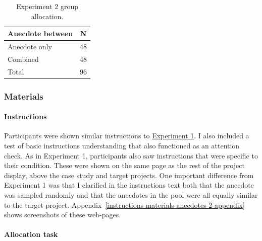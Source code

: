 \documentclass[a4paper, nobind, dvipsnames]{templates/ociamthesis}
\theoremstyle{definition}
\theoremstyle{definition}
\theoremstyle{definition}
\theoremstyle{definition}
\theoremstyle{remark}
\begin{document}
\begin{table}[tbp]

\begin{center}
\begin{threeparttable}

\caption{\label{tab:condition-allocation-anecdotes-2}Experiment 2 group allocation.}

\begin{tabular}{ll}
\toprule
Anecdote between & \multicolumn{1}{c}{N}\\
\midrule
Anecdote only & 48\\
Combined & 48\\
Total & 96\\
\bottomrule
\end{tabular}

\end{threeparttable}
\end{center}

\end{table}

\hypertarget{materials-4}{%
\subsubsection{Materials}\label{materials-4}}

\hypertarget{instructions-4}{%
\paragraph{Instructions}\label{instructions-4}}

Participants were shown similar instructions to \protect\hyperlink{instructions-materials-anecdotes-1}{Experiment
1}. I also included a test of basic
instructions understanding that also functioned as an attention check. As in
Experiment 1, participants also saw instructions that were specific to their
condition. These were shown on the same page as the rest of the project display,
above the case study and target projects. One important difference from
Experiment 1 was that I clarified in the instructions text both that the
anecdote was sampled randomly and that the anecdotes in the pool were all
equally similar to the target project.
Appendix~\ref{instructions-materials-anecdotes-2-appendix} shows screenshots of
these web-pages.

\hypertarget{allocation-anecdotes-2}{%
\paragraph{Allocation task}\label{allocation-anecdotes-2}}
\end{document}
